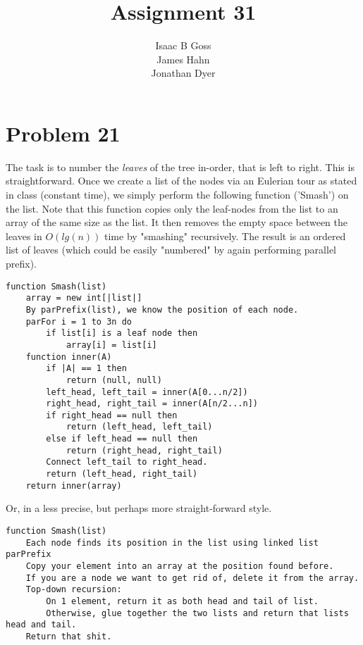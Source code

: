 \documentclass{article}
\author{Isaac B Goss\\ James Hahn\\ Jonathan Dyer}
\title{Assignment 31}
\providecommand{\prob}[1]{\section*{Problem #1}}
\begin{document}
\maketitle

\prob{21}
The task is to number the \textit{leaves} of the tree in-order, that is left to right. This is straightforward.
Once we create a list of the nodes via an Eulerian tour as stated in class (constant time), we simply perform the following function ('Smash') on the list.
Note that this function copies only the leaf-nodes from the list to an array of the same size as the list.
It then removes the empty space between the leaves in $O(lg(n))$ time by "smashing" recursively.
The result is an ordered list of leaves (which could be easily "numbered" by again performing parallel prefix).

\begin{lstlisting}
function Smash(list)
    array = new int[|list|]
    By parPrefix(list), we know the position of each node.
    parFor i = 1 to 3n do
        if list[i] is a leaf node then
            array[i] = list[i]
    function inner(A)
        if |A| == 1 then
            return (null, null)
        left_head, left_tail = inner(A[0...n/2])
        right_head, right_tail = inner(A[n/2...n])
        if right_head == null then
            return (left_head, left_tail)
        else if left_head == null then
            return (right_head, right_tail)
        Connect left_tail to right_head.
        return (left_head, right_tail)
    return inner(array)
\end{lstlisting}

Or, in a less precise, but perhaps more straight-forward style.

\begin{lstlisting}
function Smash(list)
    Each node finds its position in the list using linked list parPrefix
    Copy your element into an array at the position found before.
    If you are a node we want to get rid of, delete it from the array.
    Top-down recursion:
        On 1 element, return it as both head and tail of list.
        Otherwise, glue together the two lists and return that lists head and tail.
    Return that shit.
\end{lstlisting}
\end{document}

